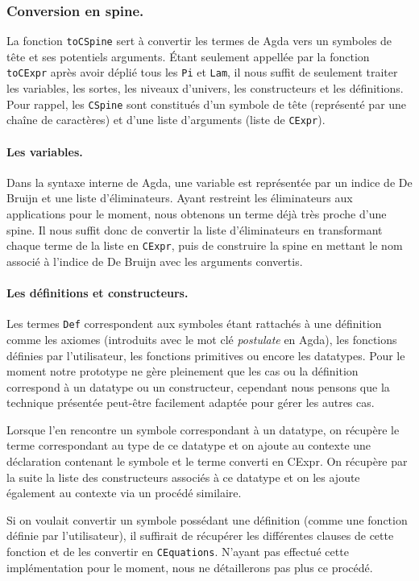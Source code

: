 \documentclass[11pt]{article}
\begin{document}
\subsubsection{Conversion en spine.}
La fonction \texttt{toCSpine} sert à convertir les termes de Agda vers un symboles de tête et ses potentiels arguments.
Étant seulement appellée par la fonction \texttt{toCExpr} après avoir déplié tous les \texttt{Pi} et \texttt{Lam}, 
il nous suffit de seulement traiter les variables, les sortes, les niveaux d'univers, les constructeurs et les définitions.
Pour rappel, les \texttt{CSpine} sont constitués d'un symbole de tête (représenté par une chaîne de caractères) et d'une liste d'arguments (liste de \texttt{CExpr}).

\paragraph{Les variables.}
Dans la syntaxe interne de Agda, une variable est représentée par un indice de De Bruijn et une liste d'éliminateurs.
Ayant restreint les éliminateurs aux applications pour le moment, nous obtenons un terme déjà très proche d'une spine.
Il nous suffit donc de convertir la liste d'éliminateurs en transformant chaque terme de la liste en \texttt{CExpr}, 
puis de construire la spine en mettant le nom associé à l'indice de De Bruijn avec les arguments convertis.

\paragraph{Les définitions et constructeurs.}
Les termes \texttt{Def} correspondent aux symboles étant rattachés à une définition comme les axiomes (introduits avec le mot clé \textit{postulate} en Agda), 
les fonctions définies par l'utilisateur, les fonctions primitives ou encore les datatypes.
Pour le moment notre prototype ne gère pleinement que les cas ou la définition correspond à un datatype ou un constructeur, 
cependant nous pensons que la technique présentée peut-être facilement adaptée pour gérer les autres cas.

Lorsque l'en rencontre un symbole correspondant à un datatype, 
on récupère le terme correspondant au type de ce datatype et on ajoute au contexte une déclaration contenant le symbole et le terme converti en CExpr.
On récupère par la suite la liste des constructeurs associés à ce datatype et on les ajoute également au contexte via un procédé similaire.

Si on voulait convertir un symbole possédant une définition (comme une fonction définie par l'utilisateur), 
il suffirait de récupérer les différentes clauses de cette fonction et de les convertir en \texttt{CEquations}.
N'ayant pas effectué cette implémentation pour le moment, nous ne détaillerons pas plus ce procédé.
\end{document}
